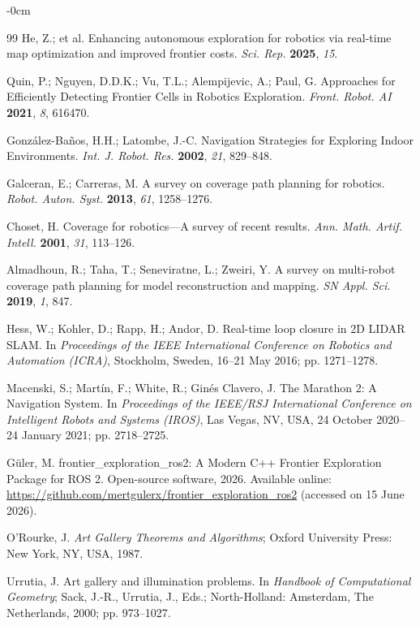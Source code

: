 \documentclass[sensors,article,submit,pdftex,moreauthors]{Definitions/mdpi}
\begin{document}
\begin{adjustwidth}{-\extralength}{0cm}
\begin{thebibliography}{99}
He, Z.; et al. Enhancing autonomous exploration for robotics via real-time map optimization and improved frontier costs. \textit{Sci. Rep.} \textbf{2025}, \textit{15}.

Quin, P.; Nguyen, D.D.K.; Vu, T.L.; Alempijevic, A.; Paul, G. Approaches for Efficiently Detecting Frontier Cells in Robotics Exploration. \textit{Front. Robot. AI} \textbf{2021}, \textit{8}, 616470.

Gonz\'alez-Ba\~nos, H.H.; Latombe, J.-C. Navigation Strategies for Exploring Indoor Environments. \textit{Int. J. Robot. Res.} \textbf{2002}, \textit{21}, 829--848.

Galceran, E.; Carreras, M. A survey on coverage path planning for robotics. \textit{Robot. Auton. Syst.} \textbf{2013}, \textit{61}, 1258--1276.

Choset, H. Coverage for robotics---A survey of recent results. \textit{Ann. Math. Artif. Intell.} \textbf{2001}, \textit{31}, 113--126.

Almadhoun, R.; Taha, T.; Seneviratne, L.; Zweiri, Y. A survey on multi-robot coverage path planning for model reconstruction and mapping. \textit{SN Appl. Sci.} \textbf{2019}, \textit{1}, 847.

Hess, W.; Kohler, D.; Rapp, H.; Andor, D. Real-time loop closure in 2D LIDAR SLAM. In \textit{Proceedings of the IEEE International Conference on Robotics and Automation (ICRA)}, Stockholm, Sweden, 16--21 May 2016; pp. 1271--1278.

Macenski, S.; Mart\'in, F.; White, R.; Gin\'es Clavero, J. The Marathon 2: A Navigation System. In \textit{Proceedings of the IEEE/RSJ International Conference on Intelligent Robots and Systems (IROS)}, Las Vegas, NV, USA, 24 October 2020--24 January 2021; pp. 2718--2725.

G\"uler, M. frontier\_exploration\_ros2: A Modern C++ Frontier Exploration Package for ROS 2. Open-source software, 2026. Available online: \url{https://github.com/mertgulerx/frontier_exploration_ros2} (accessed on 15 June 2026).

O'Rourke, J. \textit{Art Gallery Theorems and Algorithms}; Oxford University Press: New York, NY, USA, 1987.

Urrutia, J. Art gallery and illumination problems. In \textit{Handbook of Computational Geometry}; Sack, J.-R., Urrutia, J., Eds.; North-Holland: Amsterdam, The Netherlands, 2000; pp. 973--1027.


\end{thebibliography}
\end{adjustwidth}
\end{document}
